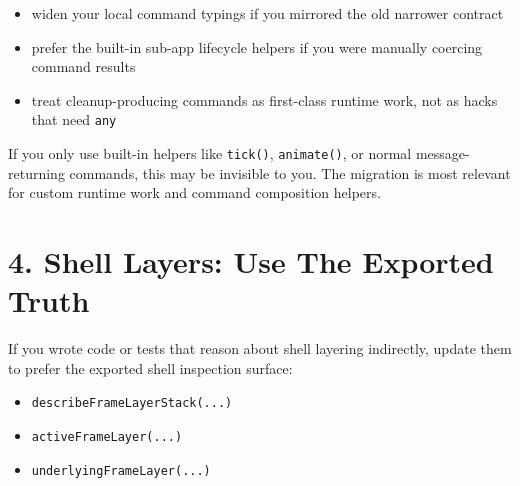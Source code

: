 \begin{itemize}
\tightlist
\item
  widen your local command typings if you mirrored the old narrower contract
\item
  prefer the built-in sub-app lifecycle helpers if you were manually coercing command results
\item
  treat cleanup-producing commands as first-class runtime work, not as hacks that need \texttt{a\allowbreak{}n\allowbreak{}y}
\end{itemize}

If you only use built-in helpers like \texttt{t\allowbreak{}i\allowbreak{}c\allowbreak{}k\allowbreak{}(\allowbreak{})}, \texttt{a\allowbreak{}n\allowbreak{}i\allowbreak{}m\allowbreak{}a\allowbreak{}t\allowbreak{}e\allowbreak{}(\allowbreak{})}, or normal message-returning commands, this may be invisible to you. The migration is most relevant for custom runtime work and command composition helpers.

\section{4. Shell Layers: Use The Exported Truth}\label{record-264-shell-layers-use-the-exported-truth}

If you wrote code or tests that reason about shell layering indirectly, update them to prefer the exported shell inspection surface:

\begin{itemize}
\tightlist
\item
  \texttt{d\allowbreak{}e\allowbreak{}s\allowbreak{}c\allowbreak{}r\allowbreak{}i\allowbreak{}b\allowbreak{}e\allowbreak{}F\allowbreak{}r\allowbreak{}a\allowbreak{}m\allowbreak{}e\allowbreak{}L\allowbreak{}a\allowbreak{}y\allowbreak{}e\allowbreak{}r\allowbreak{}S\allowbreak{}t\allowbreak{}a\allowbreak{}c\allowbreak{}k\allowbreak{}(\allowbreak{}.\allowbreak{}.\allowbreak{}.\allowbreak{})}
\item
  \texttt{a\allowbreak{}c\allowbreak{}t\allowbreak{}i\allowbreak{}v\allowbreak{}e\allowbreak{}F\allowbreak{}r\allowbreak{}a\allowbreak{}m\allowbreak{}e\allowbreak{}L\allowbreak{}a\allowbreak{}y\allowbreak{}e\allowbreak{}r\allowbreak{}(\allowbreak{}.\allowbreak{}.\allowbreak{}.\allowbreak{})}
\item
  \texttt{u\allowbreak{}n\allowbreak{}d\allowbreak{}e\allowbreak{}r\allowbreak{}l\allowbreak{}y\allowbreak{}i\allowbreak{}n\allowbreak{}g\allowbreak{}F\allowbreak{}r\allowbreak{}a\allowbreak{}m\allowbreak{}e\allowbreak{}L\allowbreak{}a\allowbreak{}y\allowbreak{}e\allowbreak{}r\allowbreak{}(\allowbreak{}.\allowbreak{}.\allowbreak{}.\allowbreak{})}
\end{itemize}

